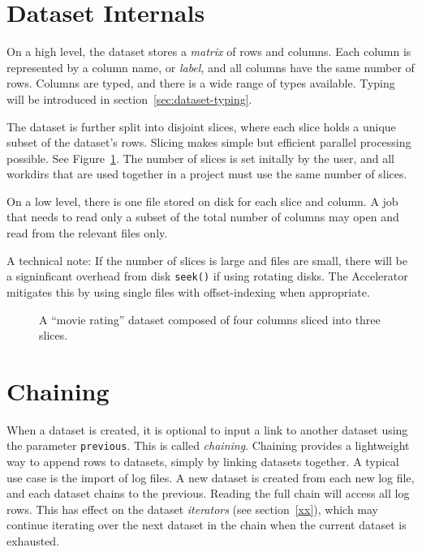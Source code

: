 

\section{Dataset Internals}

On a high level, the dataset stores a \textsl{matrix} of rows and
columns.  Each column is represented by a column name,
or \emph{label}, and all columns have the same number of rows.
Columns are typed, and there is a wide range of types available.
Typing will be introduced in section~\ref{sec:dataset-typing}.

The dataset is further split into disjoint slices, where each slice
holds a unique subset of the dataset's rows.  Slicing makes simple but
efficient parallel processing possible.  See Figure~\ref{fig:slices}.
The number of slices is set initally by the user, and all workdirs
that are used together in a project must use the same number of
slices.  

On a low level, there is one file stored on disk for each slice and
column.  A job that needs to read only a subset of the total number of
columns may open and read from the relevant files only.

A technical note: If the number of slices is large and files are
small, there will be a signinficant overhead from disk \texttt{seek()}
if using rotating disks.  The Accelerator mitigates this by using
single files with offset-indexing when appropriate.

\begin{figure}[b!]
  \begin{center}
     
     \caption{A ``movie rating'' dataset composed of four columns
              sliced into three slices.}
     \label{fig:slices}
  \end{center}
\end{figure}


\section{Chaining}
When a dataset is created, it is optional to input a link to another
dataset using the parameter \texttt{previous}.  This is called
\emph{chaining}.  Chaining provides a lightweight way to append rows
to datasets, simply by linking datasets together.  A typical use case
is the import of log files.  A new dataset is created from each new
log file, and each dataset chains to the previous.  Reading the full
chain will access all log rows.  This has effect on the dataset
\emph{iterators} (see section~\ref{xx}), which may continue iterating
over the next dataset in the chain when the current dataset is
exhausted.


